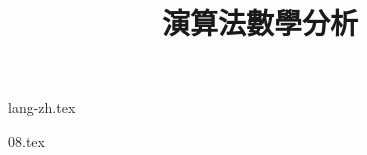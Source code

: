 \documentclass[11pt, a4paper, fleqn]{book}
\begin{document}
{lang-zh.tex}


\title{\bfseries{\sc 演算法數學分析}}
\date{}
\maketitle

\tableofcontents

{08.tex}


\end{document}
